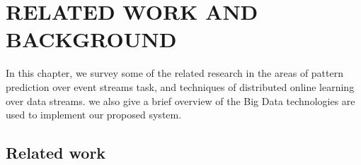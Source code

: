 
\chapter{RELATED WORK AND BACKGROUND}
\label{chap:realred_work}


\par In this chapter, we survey some of the related research in the areas of pattern prediction over event streams task, and techniques of distributed online learning over data streams. we also give a brief overview of the Big Data technologies are used to implement our proposed system.  
\section{Related work}






